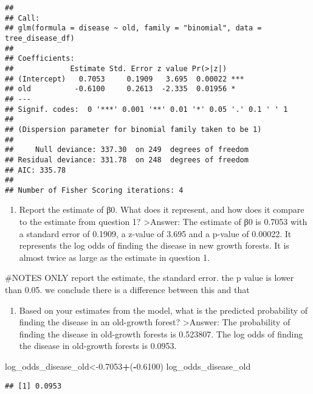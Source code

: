 \documentclass[
]{article}
\newenvironment{Shaded}{\begin{snugshade}}{\end{snugshade}}
\newcommand{\FloatTok}[1]{\textcolor[rgb]{0.00,0.00,0.81}{#1}}
\newcommand{\NormalTok}[1]{#1}
\newcommand{\OtherTok}[1]{\textcolor[rgb]{0.56,0.35,0.01}{#1}}
\newcommand{\SpecialCharTok}[1]{\textcolor[rgb]{0.81,0.36,0.00}{\textbf{#1}}}
\providecommand{\tightlist}{%
  \setlength{\itemsep}{0pt}\setlength{\parskip}{0pt}}
\begin{document}
\begin{verbatim}
## 
## Call:
## glm(formula = disease ~ old, family = "binomial", data = tree_disease_df)
## 
## Coefficients:
##             Estimate Std. Error z value Pr(>|z|)    
## (Intercept)   0.7053     0.1909   3.695  0.00022 ***
## old          -0.6100     0.2613  -2.335  0.01956 *  
## ---
## Signif. codes:  0 '***' 0.001 '**' 0.01 '*' 0.05 '.' 0.1 ' ' 1
## 
## (Dispersion parameter for binomial family taken to be 1)
## 
##     Null deviance: 337.30  on 249  degrees of freedom
## Residual deviance: 331.78  on 248  degrees of freedom
## AIC: 335.78
## 
## Number of Fisher Scoring iterations: 4
\end{verbatim}

\begin{enumerate}
\def\labelenumi{\alph{enumi}.}
\tightlist
\item
  Report the estimate of β0. What does it represent, and how does it
  compare to the estimate from question 1? \textgreater Answer: The
  estimate of β0 is 0.7053 with a standard error of 0.1909, a z-value of
  3.695 and a p-value of 0.00022. It represents the log odds of finding
  the disease in new growth forests. It is almost twice as large as the
  estimate in question 1.
\end{enumerate}

\#NOTES ONLY report the estimate, the standard error. the p value is
lower than 0.05. we conclude there is a difference between this and that

\begin{enumerate}
\def\labelenumi{\alph{enumi}.}
\setcounter{enumi}{1}
\tightlist
\item
  Based on your estimates from the model, what is the predicted
  probability of finding the disease in an old-growth forest?
  \textgreater Answer: The probability of finding the disease in
  old-growth forests is 0.523807. The log odds of finding the disease in
  old-growth forests is 0.0953.
\end{enumerate}

\begin{Shaded}
\begin{Highlighting}[]
\NormalTok{log\_odds\_disease\_old}\OtherTok{\textless{}{-}}\FloatTok{0.7053}\SpecialCharTok{+}\NormalTok{(}\SpecialCharTok{{-}}\FloatTok{0.6100}\NormalTok{)}
\NormalTok{log\_odds\_disease\_old}
\end{Highlighting}
\end{Shaded}

\begin{verbatim}
## [1] 0.0953
\end{verbatim}
\end{document}
